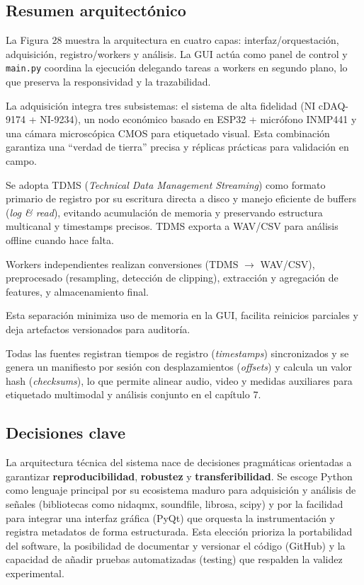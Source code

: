 \documentclass[12pt, letterpaper]{report}
\begin{document}
\subsection{Resumen arquitectónico}

La Figura 28 muestra la arquitectura en cuatro capas: interfaz/orquestación, adquisición, registro/workers y análisis. La GUI actúa como panel de control y \texttt{main.py} coordina la ejecución delegando tareas a workers en segundo plano, lo que preserva la responsividad y la trazabilidad.

La adquisición integra tres subsistemas: el sistema de alta fidelidad (NI cDAQ-9174 + NI-9234), un nodo económico basado en ESP32 + micrófono INMP441 y una cámara microscópica CMOS para etiquetado visual. Esta combinación garantiza una “verdad de tierra” precisa y réplicas prácticas para validación en campo.

Se adopta TDMS (\textit{Technical Data Management Streaming}) como formato primario de registro por su escritura directa a disco y manejo eficiente de buffers (\textit{log \& read}), evitando acumulación de memoria y preservando estructura multicanal y timestamps precisos. TDMS exporta a WAV/CSV para análisis offline cuando hace falta.

Workers independientes realizan conversiones (TDMS $\rightarrow$ WAV/CSV), preprocesado (resampling, detección de clipping), extracción y agregación de features, y almacenamiento final. 


Esta separación minimiza uso de memoria en la GUI, facilita reinicios parciales y deja artefactos versionados para auditoría.

Todas las fuentes registran tiempos de registro (\textit{timestamps}) sincronizados y se genera un manifiesto por sesión con desplazamientos (\textit{offsets}) y calcula un valor hash (\textit{checksums}), lo que permite alinear audio, video y medidas auxiliares para etiquetado multimodal y análisis conjunto en el capítulo 7.

\subsection{Decisiones clave}

La arquitectura técnica del sistema nace de decisiones pragmáticas orientadas a garantizar \textbf{reproducibilidad}, \textbf{robustez} y \textbf{transferibilidad}. Se escoge Python como lenguaje principal por su ecosistema maduro para adquisición y análisis de señales (bibliotecas como nidaqmx, soundfile, librosa, scipy) y por la facilidad para integrar una interfaz gráfica (PyQt) que orquesta la instrumentación y registra metadatos de forma estructurada. Esta elección prioriza la portabilidad del software, la posibilidad de documentar y versionar el código (GitHub) y la capacidad de añadir pruebas automatizadas (testing) que respalden la validez experimental.
\end{document}
